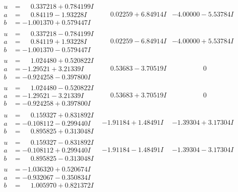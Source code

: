 \documentclass[1p]{elsarticle_modified}
\theoremstyle{definition}
\begin{document}
$$\begin{array}{c|c|c}
\begin{aligned}
u &= \phantom{-}0.337218 + 0.784199 I \\
a &= \phantom{-}0.84119 - 1.93228 I \\
b &= -1.001370 + 0.579447 I\end{aligned}
 & \phantom{-}0.02259 + 6.84914 I & -4.00000 - 5.53784 I \\ \hline\begin{aligned}
u &= \phantom{-}0.337218 - 0.784199 I \\
a &= \phantom{-}0.84119 + 1.93228 I \\
b &= -1.001370 - 0.579447 I\end{aligned}
 & \phantom{-}0.02259 - 6.84914 I & -4.00000 + 5.53784 I \\ \hline\begin{aligned}
u &= \phantom{-}1.024480 + 0.520822 I \\
a &= -1.29521 + 3.21339 I \\
b &= -0.924258 - 0.397800 I\end{aligned}
 & \phantom{-}0.53683 - 3.70519 I & \phantom{-0.000000 } 0 \\ \hline\begin{aligned}
u &= \phantom{-}1.024480 - 0.520822 I \\
a &= -1.29521 - 3.21339 I \\
b &= -0.924258 + 0.397800 I\end{aligned}
 & \phantom{-}0.53683 + 3.70519 I & \phantom{-0.000000 } 0 \\ \hline\begin{aligned}
u &= \phantom{-}0.159327 + 0.831892 I \\
a &= -0.108112 - 0.299440 I \\
b &= \phantom{-}0.895825 + 0.313048 I\end{aligned}
 & -1.91184 + 1.48491 I & -1.39304 + 3.17304 I \\ \hline\begin{aligned}
u &= \phantom{-}0.159327 - 0.831892 I \\
a &= -0.108112 + 0.299440 I \\
b &= \phantom{-}0.895825 - 0.313048 I\end{aligned}
 & -1.91184 - 1.48491 I & -1.39304 - 3.17304 I \\ \hline\begin{aligned}
u &= -1.036320 + 0.520674 I \\
a &= -0.932067 - 0.350834 I \\
b &= \phantom{-}1.005970 + 0.821372 I\end{aligned}

\end{array}$$
\end{document}
